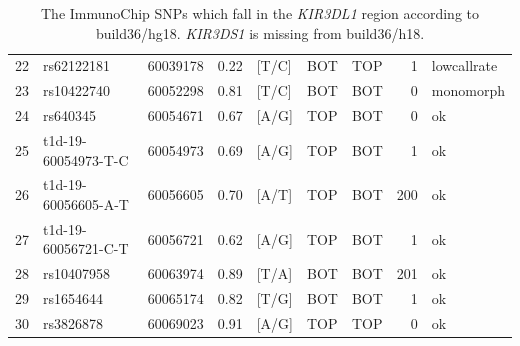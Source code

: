 \documentclass[12pt,a4paper,twoside]{article}
\begin{document}
\begin{table}[h]
\begin{center}
\begin{tabular}{rlrrlllrl}
  22 & rs62122181 & 60039178 & 0.22 & [T/C] & BOT & TOP &   1 & lowcallrate \\ 
  23 & rs10422740 & 60052298 & 0.81 & [T/C] & BOT & BOT &   0 & monomorph \\ 
  24 & rs640345 & 60054671 & 0.67 & [A/G] & TOP & BOT &   0 & ok \\ 
  25 & t1d-19-60054973-T-C & 60054973 & 0.69 & [A/G] & TOP & BOT &   1 & ok \\ 
  26 & t1d-19-60056605-A-T & 60056605 & 0.70 & [A/T] & TOP & BOT & 200 & ok \\ 
  27 & t1d-19-60056721-C-T & 60056721 & 0.62 & [A/G] & TOP & BOT &   1 & ok \\ 
  28 & rs10407958 & 60063974 & 0.89 & [T/A] & BOT & BOT & 201 & ok \\ 
  29 & rs1654644 & 60065174 & 0.82 & [T/G] & BOT & BOT &   1 & ok \\ 
  30 & rs3826878 & 60069023 & 0.91 & [A/G] & TOP & TOP &   0 & ok \\ 
\end{tabular}
\end{center}
    \caption{
        The ImmunoChip SNPs which fall in the \emph{KIR3DL1} region according to build36/hg18.
        \emph{KIR3DS1} is missing from build36/h18.
    }
    \label{table:ImmunoChip-SNPs}
\end{table}




\end{document}
